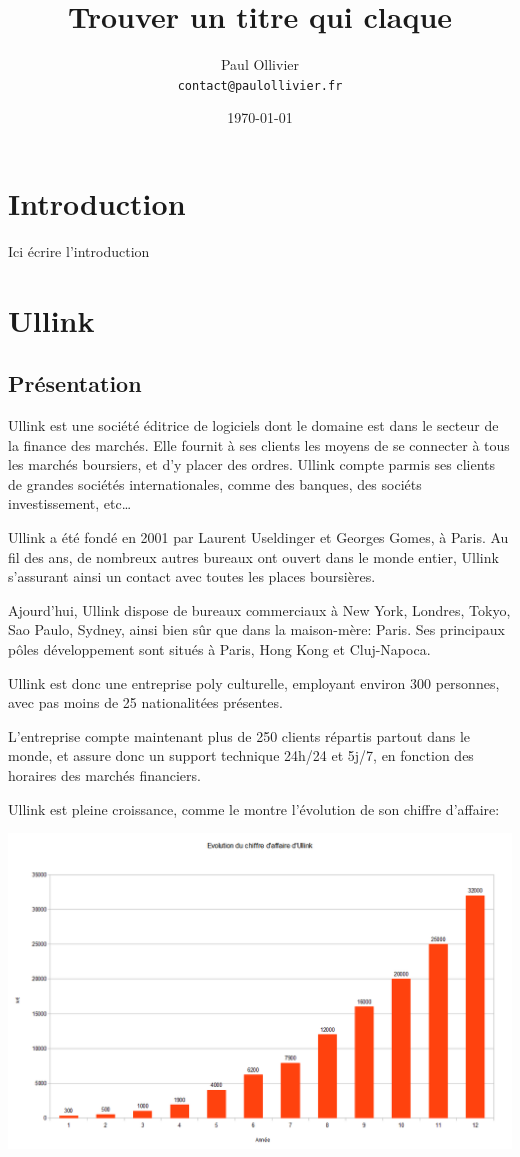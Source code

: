 \documentclass[a4paper, 11pt]{article}
\author{Paul Ollivier\\
\texttt{contact@paulollivier.fr}}
\title{Trouver un titre qui claque}
\date{\today}
\begin{document}
\maketitle
\pagebreak

\section*{Introduction}

Ici écrire l'introduction
\pagebreak
\tableofcontents
\pagebreak
\section{Ullink}
\subsection{Présentation}
Ullink est une société éditrice de logiciels dont le domaine est dans le secteur de la finance des marchés. Elle fournit à ses clients les moyens de se connecter à tous les marchés boursiers, et d'y placer des ordres. Ullink compte parmis ses clients de grandes sociétés internationales, comme des banques, des sociéts investissement, etc\dots

Ullink a été fondé en 2001 par Laurent Useldinger et Georges Gomes, à Paris. Au fil des ans, de nombreux autres bureaux ont ouvert dans le monde entier, Ullink s'assurant ainsi un contact avec toutes les places boursières.

Ajourd'hui, Ullink dispose de bureaux commerciaux à New York, Londres, Tokyo, Sao Paulo, Sydney, ainsi bien sûr que dans la maison-mère: Paris. Ses principaux pôles développement sont situés à Paris, Hong Kong et Cluj-Napoca.

Ullink est donc une entreprise poly culturelle, employant environ 300 personnes, avec pas moins de 25 nationalitées présentes.

L'entreprise compte maintenant plus de 250 clients répartis partout dans le monde, et assure donc un support technique 24h/24 et 5j/7, en fonction des horaires des marchés financiers.

Ullink est pleine croissance, comme le montre l'évolution de son chiffre d'affaire:

\includegraphics[width=\textwidth]{ca_ullink.png}
\end{document}
